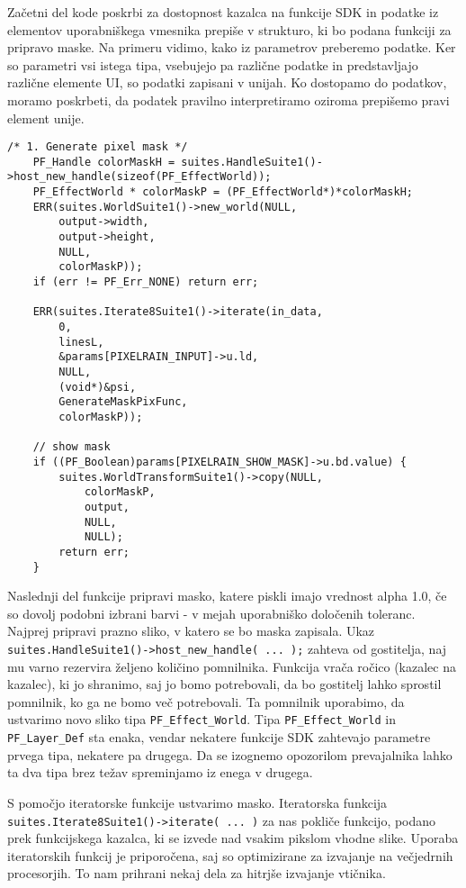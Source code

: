 \documentclass[a4paper, 12pt]{book}
\begin{document}
Začetni del kode poskrbi za dostopnost kazalca na funkcije SDK in podatke iz elementov uporabniškega vmesnika prepiše v strukturo, 
ki bo podana funkciji za pripravo maske.
Na primeru vidimo, kako iz parametrov preberemo podatke.
Ker so parametri vsi istega tipa, vsebujejo pa različne podatke in predstavljajo različne elemente UI, so podatki zapisani v unijah.
Ko dostopamo do podatkov, moramo poskrbeti, da podatek pravilno interpretiramo oziroma prepišemo pravi element unije.

\begin{verbatim}
/* 1. Generate pixel mask */
    PF_Handle colorMaskH = suites.HandleSuite1()->host_new_handle(sizeof(PF_EffectWorld));
    PF_EffectWorld * colorMaskP = (PF_EffectWorld*)*colorMaskH;
    ERR(suites.WorldSuite1()->new_world(NULL,
        output->width,
        output->height,
        NULL,
        colorMaskP));
    if (err != PF_Err_NONE) return err;
    
    ERR(suites.Iterate8Suite1()->iterate(in_data,
        0,                        
        linesL,                   
        &params[PIXELRAIN_INPUT]->u.ld, 
        NULL,                        
        (void*)&psi,        
        GenerateMaskPixFunc,  
        colorMaskP));
    
    // show mask
    if ((PF_Boolean)params[PIXELRAIN_SHOW_MASK]->u.bd.value) {
        suites.WorldTransformSuite1()->copy(NULL,
            colorMaskP,
            output,
            NULL,
            NULL);
        return err;
    }
\end{verbatim}

Naslednji del funkcije pripravi masko, katere piskli imajo vrednost alpha 1.0, če so dovolj podobni izbrani barvi - v mejah uporabniško določenih toleranc.
Najprej pripravi prazno sliko, v katero se bo maska zapisala.
Ukaz \verb!suites.HandleSuite1()->host_new_handle( ... );! zahteva od gostitelja, naj mu varno rezervira željeno količino pomnilnika.
Funkcija vrača ročico (kazalec na kazalec), ki jo shranimo, saj jo bomo potrebovali, da bo gostitelj lahko sprostil pomnilnik, ko ga ne bomo več potrebovali.
Ta pomnilnik uporabimo, da ustvarimo novo sliko tipa \verb!PF_Effect_World!.
Tipa \verb!PF_Effect_World! in \verb!PF_Layer_Def! sta enaka, vendar nekatere funkcije SDK zahtevajo parametre prvega tipa, nekatere pa drugega.
Da se izognemo opozorilom prevajalnika lahko ta dva tipa brez težav spreminjamo iz enega v drugega.

S pomočjo iteratorske funkcije ustvarimo masko.
Iteratorska funkcija \verb!suites.Iterate8Suite1()->iterate( ... )! za nas pokliče funkcijo, podano prek funkcijskega kazalca, ki se izvede nad vsakim pikslom vhodne slike.
Uporaba iteratorskih funkcij je priporočena, saj so optimizirane za izvajanje na  večjedrnih procesorjih.
To nam prihrani nekaj dela za hitrjše izvajanje vtičnika.
\end{document}
